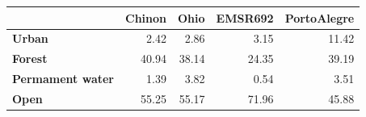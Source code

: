 \begin{tabular}{lrrrr}
\toprule
 & Chinon & Ohio & EMSR692 & PortoAlegre \\
\midrule
\textbf{Urban} & 2.42 & 2.86 & 3.15 & 11.42 \\
\textbf{Forest} & 40.94 & 38.14 & 24.35 & 39.19 \\
\textbf{Permament water} & 1.39 & 3.82 & 0.54 & 3.51 \\
\textbf{Open} & 55.25 & 55.17 & 71.96 & 45.88 \\
\bottomrule
\end{tabular}
